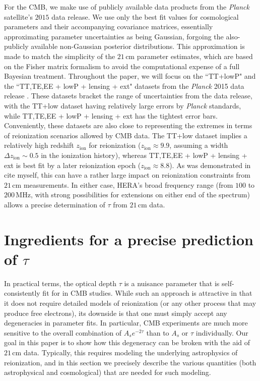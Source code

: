 \documentclass[twocolumn,aps,prd,nofootinbib,showpacs]{revtex4-1}
\begin{document}
For the CMB, we make use of publicly available data products from the \emph{Planck} satellite's $2015$ data release. We use only the best fit values for cosmological parameters and their accompanying covariance matrices, essentially approximating parameter uncertainties as being Gaussian, forgoing the also-publicly available non-Gaussian posterior distributions. This approximation is made to match the simplicity of the $21\,\textrm{cm}$ parameter estimates, which are based on the Fisher matrix formalism to avoid the computational expense of a full Bayesian treatment. Throughout the paper, we will focus on the ``TT+lowP" and the ``TT,TE,EE + lowP + lensing + ext" datasets from the \emph{Planck} 2015 data release \cite{Planck2015parameters,Planck2015likelihood}. These datasets bracket the range of uncertainties from the data release, with the TT+low dataset having relatively large errors by \emph{Planck} standards, while TT,TE,EE + lowP + lensing + ext has the tightest error bars. Conveniently, these datasets are also close to representing the extremes in terms of reionization scenarios allowed by CMB data. The TT+low dataset implies a relatively high redshift $z_\textrm{ion}$ for reionization ($z_\textrm{ion} \approx 9.9$, assuming a width $\Delta z_\textrm{ion} \sim 0.5$ in the ionization history), whereas TT,TE,EE + lowP + lensing + ext is best fit by a later reionization epoch ($z_\textrm{ion} \approx 8.8$). As was demonstrated in \acl{cite myself}, this can have a rather large impact on reionization constraints from $21\,\textrm{cm}$ measurements. In either case, HERA's broad frequency range (from $100$ to $200\,\textrm{MHz}$, with strong possibilities for extensions on either end of the spectrum) allows a precise determination of $\tau$ from $21\,\textrm{cm}$ data.

\section{Ingredients for a precise prediction of $\tau$ }
\label{sec:Ingredients}

In practical terms, the optical depth $\tau$ is a nuisance parameter that is self-consistently fit for in CMB studies. While such an approach is attractive in that it does not require detailed models of reionization (or any other process that may produce free electrons), its downside is that one must simply accept any degeneracies in parameter fits. In particular, CMB experiments are much more sensitive to the overall combination of $A_s e^{-2\tau}$ than to $A_s$ or $\tau$ individually. Our goal in this paper is to show how this degeneracy can be broken with the aid of $21\,\textrm{cm}$ data. Typically, this requires modeling the underlying astrophysics of reionization, and in this section we precisely describe the various quantities (both astrophysical and cosmological) that are needed for such modeling.
\end{document}
